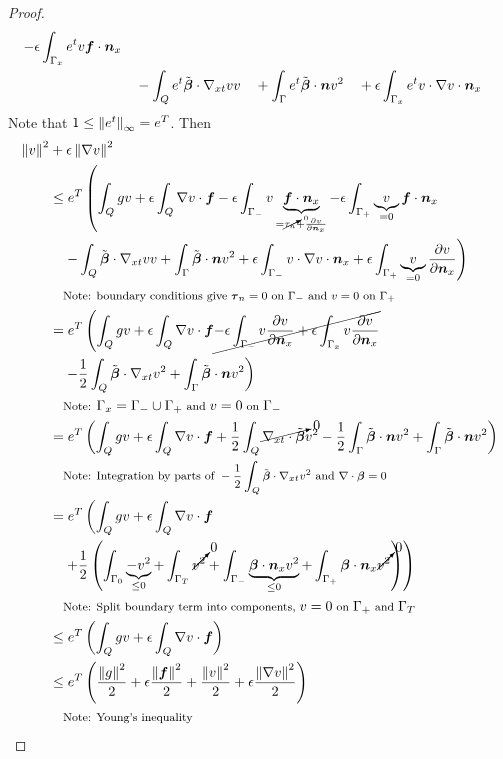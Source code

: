 \documentclass[Dissertation.tex]{subfiles}
\begin{document}
\begin{proof}
\begin{align*}
-\epsilon\int_{\Gamma_x}e^{t}v\boldsymbol f\cdot\boldsymbol n_x\\
&\quad-\int_Qe^{t}\tilde{\boldsymbol\beta}\cdot\nabla_{xt} vv
\quad+\int_\Gamma e^{t}\tilde{\boldsymbol\beta}\cdot\boldsymbol n v^2
\quad+\epsilon\int_{\Gamma_x}e^{t}v\cdot\nabla v\cdot\boldsymbol n_x
\end{align*}
Note that $1\leq\left\| e^t \right\|_\infty=e^T$.
Then
\begin{align*}
\left\| v \right\|^2
&+\epsilon\left\| \nabla v \right\|^2
\\
&\leq
e^T\left(
\int_Qgv
+\epsilon\int_Q\nabla v\cdot\boldsymbol f
-\epsilon\int_{\Gamma_-}v\underbrace{\boldsymbol f\cdot\boldsymbol n_x}_{=\cancelto{0}{\tau_n}+\frac{\partial v}{\partial\boldsymbol n_x}}
-\epsilon\int_{\Gamma_+}\underbrace{v}_{=0}\boldsymbol f\cdot\boldsymbol n_x
\right.\\
&\left.
\quad-\int_Q\tilde{\boldsymbol\beta}\cdot\nabla_{xt} vv
+\int_\Gamma \tilde{\boldsymbol\beta}\cdot\boldsymbol n v^2
+\epsilon\int_{\Gamma_-}v\cdot\nabla v\cdot\boldsymbol n_x
+\epsilon\int_{\Gamma_+}\underbrace{v}_{=0}\frac{\partial v}{\partial\boldsymbol n_x}
\right)
\\
&\quad\footnotesize{\text{Note: boundary conditions give }\boldsymbol\tau_n=0\text{ on }\Gamma_-\text{ and }v=0\text{ on }\Gamma_+}
\\
&=
e^T\left(
\int_Qgv
+\epsilon\int_Q\nabla v\cdot\boldsymbol f
\cancel{
-\epsilon\int_{\Gamma_-}v\frac{\partial v}{\partial\boldsymbol n_x}
+\epsilon\int_{\Gamma_x}v\frac{\partial v}{\partial\boldsymbol n_x}
}
\right.\\
&\left.
\quad
-\frac{1}{2}\int_Q\tilde{\boldsymbol\beta}\cdot\nabla_{xt} v^2
+\int_\Gamma \tilde{\boldsymbol\beta}\cdot\boldsymbol n v^2
\right)
\\
&\quad\footnotesize{\text{Note: }\Gamma_x=\Gamma_-\cup\Gamma_+\text{ and }v=0\text{ on }\Gamma_-}
\\
&=
e^T\left(
\int_Qgv
+\epsilon\int_Q\nabla v\cdot\boldsymbol f
+\frac{1}{2}\int_Q\cancelto{0}{\nabla_{xt}\cdot\tilde{\boldsymbol\beta}} v^2
-\frac{1}{2}\int_\Gamma\tilde{\boldsymbol\beta}\cdot\boldsymbol n v^2
+\int_\Gamma \tilde{\boldsymbol\beta}\cdot\boldsymbol n v^2
\right)
\\
&\quad\footnotesize{\text{Note: Integration by parts of }-\frac{1}{2}\int_Q\tilde{\boldsymbol\beta}\cdot\ensuremath{\nabla_{xt}}v^2\text{ and }\ensuremath{\nabla\cdot}\boldsymbol\beta=0} 
\\
&=
e^T\left(
\int_Qgv
+\epsilon\int_Q\nabla v\cdot\boldsymbol f
\right.\\
&\left.
\quad
+\frac{1}{2}\left( \int_{\Gamma_0} \underbrace{-v^2}_{\leq 0}
+\int_{\Gamma_T} \cancelto{0}{v^2}
+\int_{\Gamma_-} \underbrace{\boldsymbol\beta\cdot\boldsymbol n_x v^2}_{\leq 0}
+\int_{\Gamma_+} \boldsymbol\beta\cdot\boldsymbol n_x \cancelto{0}{v^2}
 \right)
\right)
\\
&\quad\footnotesize{\text{Note: Split boundary term into components, }v=0\text{ on }\Gamma_+\text{ and }\Gamma_T} 
\\
&\leq
e^T\left(
\int_Qgv
+\epsilon\int_Q\nabla v\cdot\boldsymbol f
\right)
\\
&\leq
e^T\left(
\frac{\left\| g \right\|^2}{2}
+\epsilon\frac{\left\| \boldsymbol f \right\|^2}{2}
+\frac{\left\| v \right\|^2}{2}
+\epsilon\frac{\left\| \nabla v \right\|^2}{2}
\right)
\\
&\quad\footnotesize{\text{Note: Young's inequality}}
\end{align*}
\end{proof}
\end{document}
